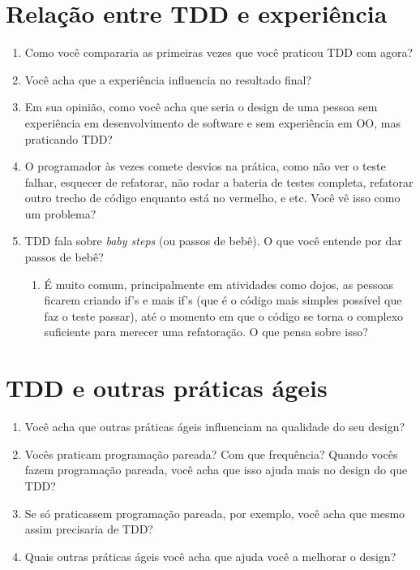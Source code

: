 \section{Relação entre TDD e experiência}

\begin{enumerate}
	\item Como você compararia as primeiras vezes que você praticou TDD com agora?
	\item Você acha que a experiência influencia no resultado final?
	\item Em sua opinião, como você acha que seria o design de uma pessoa sem experiência em desenvolvimento de software e sem experiência em OO, mas praticando TDD?
	\item O programador às vezes comete desvios na prática, como não ver o teste falhar, esquecer de refatorar, não rodar a bateria de testes completa, refatorar outro trecho de código enquanto está no vermelho, e etc. Você vê isso como um problema?
	\item TDD fala sobre \textit{baby steps} (ou passos de bebê). O que você entende por dar passos de bebê?
	\begin{enumerate}
		\item É muito comum, principalmente em atividades como dojos, as pessoas ficarem criando if's e mais if's (que é o código mais simples possível que faz o teste passar), até o momento em que o código se torna o complexo suficiente para merecer uma refatoração. O que pensa sobre isso?
	\end{enumerate}
\end{enumerate}

\section{TDD e outras práticas ágeis}

\begin{enumerate}
	\item Você acha que outras práticas ágeis influenciam na qualidade do seu design?
	\item Vocês praticam programação pareada? Com que frequência? Quando vocês fazem programação pareada, você acha que isso ajuda mais no design do que TDD?
	\item Se só praticassem programação pareada, por exemplo, você acha que mesmo assim precisaria de TDD?
	\item Quais outras práticas ágeis você acha que ajuda você a melhorar o design?
\end{enumerate}

